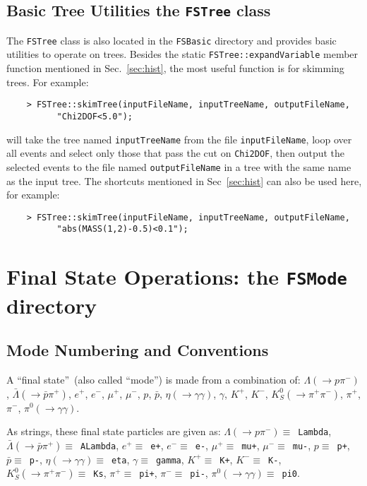\documentclass[11pt]{article}
\begin{document}
\subsection{Basic Tree Utilities the {\tt FSTree} class}
\label{sec:tree}

The {\tt FSTree} class is also located in the {\tt FSBasic} directory and provides basic utilities to operate on trees.  
Besides the static {\tt FSTree::expandVariable} member function mentioned in Sec.~\ref{sec:hist}, the most useful function is for skimming trees.  For example:
\begin{verbatim}
    > FSTree::skimTree(inputFileName, inputTreeName, outputFileName,
          "Chi2DOF<5.0"); 
\end{verbatim}
will take the tree named {\tt inputTreeName} from the file {\tt inputFileName}, loop over all events and select only those that pass the cut on {\tt Chi2DOF}, then output the selected events to the file named {\tt outputFileName} in a tree with the same name as the input tree.  The shortcuts mentioned in Sec~\ref{sec:hist} can also be used here, for example:
\begin{verbatim}
    > FSTree::skimTree(inputFileName, inputTreeName, outputFileName,
          "abs(MASS(1,2)-0.5)<0.1"); 
\end{verbatim}


\section{Final State Operations:  the {\tt FSMode} directory}
\label{sec:modes}

\subsection{Mode Numbering and Conventions}
\label{sec:modeconv}

A ``final state''~(also called ``mode'') is made from a combination of: $\Lambda (\to p \pi^-)$, $\bar{\Lambda} (\to \bar{p} \pi^+)$, $e^+$, $e^-$, $\mu^+$, $\mu^-$, $p$, $\bar{p}$, $\eta (\to \gamma\gamma)$, $\gamma$, $K^+$, $K^-$, $K^0_S (\to \pi^+\pi^-)$, $\pi^+$, $\pi^-$, $\pi^0 (\to \gamma\gamma)$.

As strings, these final state particles are given as:
$\Lambda (\to p \pi^-) \equiv $~{\tt Lambda}, 
$\bar{\Lambda} (\to \bar{p} \pi^+) \equiv $~{\tt ALambda}, 
$e^+ \equiv $~{\tt e+}, 
$e^- \equiv $~{\tt e-}, 
$\mu^+ \equiv $~{\tt mu+},  
$\mu^- \equiv $~{\tt mu-}, 
$p \equiv $~{\tt p+}, 
$\bar{p} \equiv $~{\tt p-}, 
$\eta (\to \gamma\gamma) \equiv $~{\tt eta}, 
$\gamma \equiv $~{\tt gamma}, 
$K^+ \equiv $~{\tt K+}, 
$K^- \equiv $~{\tt K-}, 
$K^0_S (\to \pi^+\pi^-) \equiv $~{\tt Ks}, 
$\pi^+ \equiv $~{\tt pi+}, 
$\pi^- \equiv $~{\tt pi-}, 
$\pi^0 (\to \gamma\gamma) \equiv $~{\tt pi0}.
\end{document}
